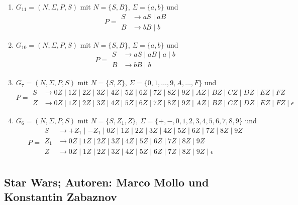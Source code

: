 \documentclass[a4paper, fleqn]{article}
\begin{document}
\subsubsection{}
\begin{enumerate}[label=\alph*)]
    \item $G_{11}=(N,\Sigma,P,S)$ mit $N=\{S, B\}$, $\Sigma=\{a,b\}$ und
    \[P=
    \begin{split}
        S&\rightarrow aS\mid aB\\
        B&\rightarrow bB\mid b
    \end{split}
    \]
    \item $G_{10}=(N,\Sigma,P,S)$ mit $N=\{S, B\}$, $\Sigma=\{a,b\}$ und
    \[P=
    \begin{split}
        S&\rightarrow aS\mid aB\mid a\mid b\\
        B&\rightarrow bB\mid b
    \end{split}
    \]
    \item $G_7=(N,\Sigma,P,S)$ mit $N=\{S, Z\}$, $\Sigma=\{0,1,\dots,9,A,\dots,F\}$ und
    \[P=
    \begin{split}
        S&\rightarrow 0Z\mid 1Z\mid 2Z\mid 3Z\mid 4Z\mid 5Z\mid 6Z\mid 7Z\mid 8Z\mid 9Z\mid AZ\mid BZ\mid CZ\mid DZ\mid EZ\mid FZ\\
        Z&\rightarrow 0Z\mid 1Z\mid 2Z\mid 3Z\mid 4Z\mid 5Z\mid 6Z\mid 7Z\mid 8Z\mid 9Z\mid AZ\mid BZ\mid CZ\mid DZ\mid EZ\mid FZ\mid \epsilon
    \end{split}
    \]
    \item $G_6=(N,\Sigma,P,S)$ mit $N=\{S, Z_1, Z\}$, $\Sigma=\{+,-,0,1,2,3,4,5,6,7,8,9\}$ und
    \[P=
    \begin{split}
        S&\rightarrow+Z_1\mid -Z_1\mid 0Z\mid 1Z\mid 2Z\mid 3Z\mid 4Z\mid 5Z\mid 6Z\mid 7Z\mid 8Z\mid 9Z\\
        Z_1&\rightarrow 0Z\mid 1Z\mid 2Z\mid 3Z\mid 4Z\mid 5Z\mid 6Z\mid 7Z\mid 8Z\mid 9Z\\
        Z&\rightarrow 0Z\mid 1Z\mid 2Z\mid 3Z\mid 4Z\mid 5Z\mid 6Z\mid 7Z\mid 8Z\mid 9Z\mid \epsilon\\
    \end{split}
    \]
\end{enumerate}
\setcounter{subsection}{3}
\subsection{Star Wars; Autoren: Marco Mollo und Konstantin Zabaznov}
\end{document}

